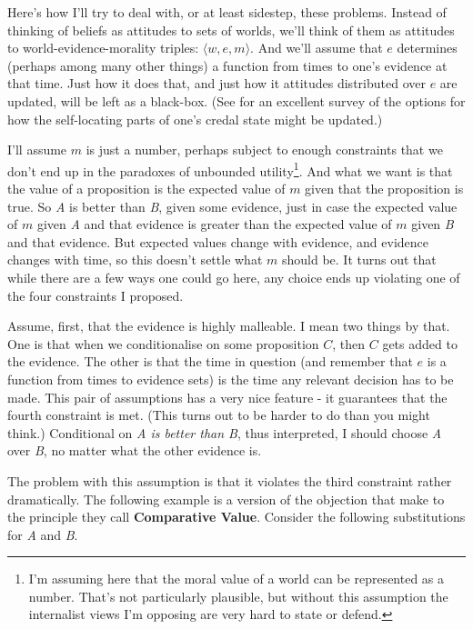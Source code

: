 Here's how I'll try to deal with, or at least sidestep, these problems. Instead of thinking of beliefs as attitudes to sets of worlds, we'll think of them as attitudes to world-evidence-morality triples: $\langle w, e, m \rangle$. And we'll assume that $e$ determines (perhaps among many other things) a function from times to one's evidence at that time. Just how it does that, and just how it attitudes distributed over $e$ are updated, will be left as a black-box. (See \citet{Titelbaum2016} for an excellent survey of the options for how the self-locating parts of one's credal state might be updated.)

I'll assume $m$ is just a number, perhaps subject to enough constraints that we don't end up in the paradoxes of unbounded utility\footnote{I'm assuming here that the moral value of a world can be represented as a number. That's not particularly plausible, but without this assumption the internalist views I'm opposing are very hard to state or defend.}. And what we want is that the value of a proposition is the expected value of $m$ given that the proposition is true. So \emph{A} is better than \emph{B}, given some evidence, just in case the expected value of $m$ given \emph{A} and that evidence is greater than the expected value of $m$ given \emph{B} and that evidence. But expected values change with evidence, and evidence changes with time, so this doesn't settle what $m$ should be. It turns out that while there are a few ways one could go here, any choice ends up violating one of the four constraints I proposed.

Assume, first, that the evidence is highly malleable. I mean two things by that. One is that when we conditionalise on some proposition $C$, then $C$ gets added to the evidence. The other is that the time in question (and remember that $e$ is a function from times to evidence sets) is the time any relevant decision has to be made. This pair of assumptions has a very nice feature - it guarantees that the fourth constraint is met. (This turns out to be harder to do than you might think.) Conditional on \emph{A is better than B}, thus interpreted, I should choose \emph{A} over \emph{B}, no matter what the other evidence is.

The problem with this assumption is that it violates the third constraint rather dramatically. The following example is a version of the objection that \citet[315-6]{RussellHawthorne2016} make to the principle they call \textbf{Comparative Value}. Consider the following substitutions for \emph{A} and \emph{B}.

